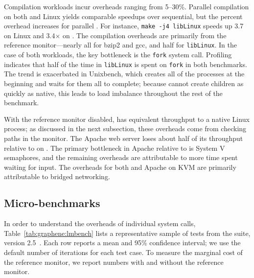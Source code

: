 Compilation workloads incur overheads ranging from 5--30\%.
Parallel compilation on both \sysname{} and Linux yields comparable  speedups  over sequential,
but the percent overhead increases for parallel \sysname{}.
For instance, {\tt make -j4 libLinux} speeds up 3.7\x{} on Linux and 3.4$\times$ on \sysname{}.
The compilation overheads are primarily from the reference monitor---nearly all for bzip2 and gcc, and half for {\tt libLinux}.
In the case of both \busy{} workloads, the key bottleneck is the {\tt fork} system call.
Profiling indicates that half of the time in {\tt libLinux} is spent on {\tt fork} in both benchmarks.
The trend is exacerbated in Unixbench, which creates all of the processes at the beginning and
waits for them all to complete; because \sysname{} cannot create children as quickly as native, this leads to 
load imbalance throughout the rest of the benchmark.  

With the reference monitor disabled,  \light{} has equivalent throughput to a native Linux process;
as discussed in the next subsection, these overheads come from checking paths in the monitor.
The Apache web server loses about half of its throughput relative to \light{} on \sysname{}.
The primary bottleneck in Apache relative to \light{} is System V semaphores,
and the remaining overheads are attributable to more time spent waiting for input.
The overheads for both \light{} and Apache on KVM are primarily attributable
to bridged networking.





\subsection{Micro-benchmarks}
\label{sec:graphene:eval:micro}

In order to understand the overheads of individual system calls,
Table~\ref{tab:graphene:lmbench} lists 
a representative sample of 
tests from the
\lmbench{} suite, version 2.5~\citep{McVoy:lmbench}.
Each row reports a mean and 95\% confidence interval;
we use the default number of iterations for each test case.
To measure the marginal cost of the reference monitor, we report numbers with and without 
the reference monitor.

